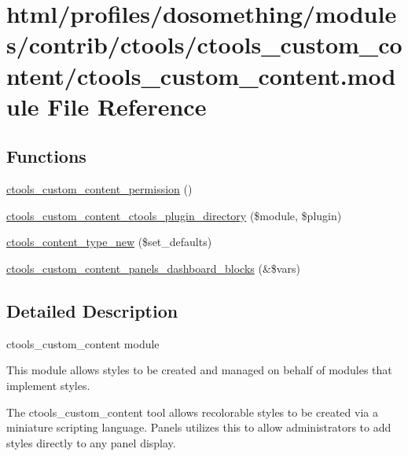 \hypertarget{ctools__custom__content_8module}{
\section{html/profiles/dosomething/modules/contrib/ctools/ctools\_\-custom\_\-content/ctools\_\-custom\_\-content.module File Reference}
\label{ctools__custom__content_8module}
}
\subsection*{Functions}
\begin{DoxyCompactItemize}
\item 
\hyperlink{ctools__custom__content_8module_a5f5ede01b7a02c98d68d8085937decc5}{ctools\_\-custom\_\-content\_\-permission} ()
\item 
\hyperlink{ctools__custom__content_8module_a351c998fc523ae1b2d30a31d50f4e83f}{ctools\_\-custom\_\-content\_\-ctools\_\-plugin\_\-directory} (\$module, \$plugin)
\item 
\hyperlink{ctools__custom__content_8module_a98509a69bb51e0d72291542e7a64c183}{ctools\_\-content\_\-type\_\-new} (\$set\_\-defaults)
\item 
\hyperlink{ctools__custom__content_8module_aa622884725456ba310ceb77ae8640faa}{ctools\_\-custom\_\-content\_\-panels\_\-dashboard\_\-blocks} (\&\$vars)
\end{DoxyCompactItemize}


\subsection{Detailed Description}
ctools\_\-custom\_\-content module

This module allows styles to be created and managed on behalf of modules that implement styles.

The ctools\_\-custom\_\-content tool allows recolorable styles to be created via a miniature scripting language. Panels utilizes this to allow administrators to add styles directly to any panel display. 

